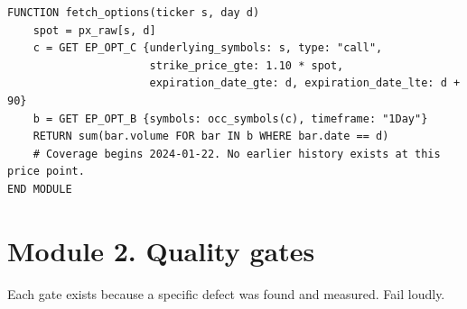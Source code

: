 \documentclass[10pt]{article}
\begin{document}
\begin{lstlisting}
FUNCTION fetch_options(ticker s, day d)
    spot = px_raw[s, d]
    c = GET EP_OPT_C {underlying_symbols: s, type: "call",
                      strike_price_gte: 1.10 * spot,
                      expiration_date_gte: d, expiration_date_lte: d + 90}
    b = GET EP_OPT_B {symbols: occ_symbols(c), timeframe: "1Day"}
    RETURN sum(bar.volume FOR bar IN b WHERE bar.date == d)
    # Coverage begins 2024-01-22. No earlier history exists at this price point.
END MODULE
\end{lstlisting}

\section{Module 2. Quality gates}

Each gate exists because a specific defect was found and measured. Fail loudly.
\end{document}
